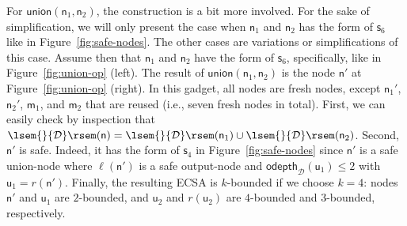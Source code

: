 \documentclass[
a4paper
]{article}
\theoremstyle{plain}
\theoremstyle{definition}
\theoremstyle{remark}
\newcommand{\D}{\mathcal{D}}
\newcommand{\n}{\textsf{n}}
\newcommand{\m}{\textsf{m}}
\newcommand{\s}{\textsf{s}}
\newcommand{\unode}{\textsf{u}}
\newcommand{\odepth}{\operatorname{odepth}}
\newcommand{\dunion}{\operatorname{union}}
\newcommand{\sem}[1]{{\lsem{}{#1}\rsem}}
\renewcommand{\operatorname}[1]{\textsf{#1}}
\begin{document}
For $\dunion(\n_1, \n_2)$, the construction is a bit more involved. For the sake of simplification, we will only present the case when $\n_1$ and $\n_2$ has the form of $\s_6$ like in Figure~\ref{fig:safe-nodes}. The other cases are variations or simplifications of this case. Assume then that $\n_1$ and $\n_2$ have the form of $\s_6$, specifically, like in Figure~\ref{fig:union-op} (left). The result of $\dunion(\n_1, \n_2)$ is the node $\n'$ at Figure~\ref{fig:union-op} (right).
In this gadget, all nodes are fresh nodes, except $\n_1'$, $\n_2'$, $\m_1$, and $\m_2$ that are reused (i.e., seven fresh nodes in total). First, we can easily check by inspection that $\sem{\D}(\n) = \sem{\D}(\n_1) \cup \sem{\D}(\n_2)$. Second, $\n'$ is safe. Indeed, it has the form of $\s_4$ in Figure~\ref{fig:safe-nodes} since $\n'$ is a safe union-node where $\ell(\n')$ is a safe output-node and $\odepth_\D(\unode_1) \leq 2$ with $\unode_1 = r(\n')$. Finally, the resulting ECSA is $k$-bounded if we choose $k = 4$: 
nodes $\n'$ and $ \unode_1$ are $2$-bounded, and $\unode_2$ and $r(\unode_2)$ are $4$-bounded and $3$-bounded, respectively. 
\end{document}

